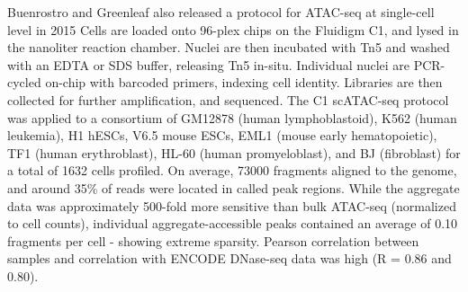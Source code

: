 Buenrostro and Greenleaf also released a protocol for ATAC-seq at single-cell level in 2015 Cells are loaded onto 96-plex chips on the Fluidigm C1, and lysed in the nanoliter reaction chamber. Nuclei are then incubated with Tn5 and washed with an EDTA or SDS buffer, releasing Tn5 in-situ. Individual nuclei are PCR-cycled on-chip with barcoded primers, indexing cell identity. Libraries are then collected for further amplification, and sequenced. The C1 scATAC-seq protocol was applied to a consortium of GM12878 (human lymphoblastoid), K562 (human leukemia), H1 hESCs, V6.5 mouse ESCs, EML1 (mouse early hematopoietic), TF1 (human erythroblast), HL-60 (human promyeloblast), and BJ (fibroblast) for a total of \num{1632} cells profiled. On average, \num{73000} fragments aligned to the genome, and around 35\% of reads were located in called peak regions. While the aggregate data was approximately 500-fold more sensitive than bulk ATAC-seq (normalized to cell counts), individual aggregate-accessible peaks contained an average of 0.10 fragments per cell - showing extreme sparsity. Pearson correlation between samples and correlation with ENCODE DNase-seq data was high (R = 0.86 and 0.80).


